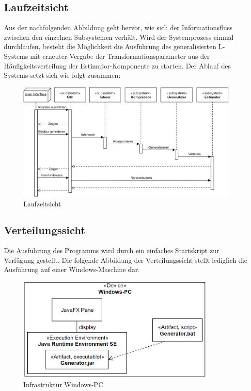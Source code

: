 \subsection*{Laufzeitsicht}
Aus der nachfolgenden Abbildung geht hervor, wie sich der Informationsfluss zwischen den einzelnen Subsystemen verhält.
Wird der Systemprozess einmal durchlaufen, besteht die Möglichkeit die Ausführung des generalisierten L-Systems mit
erneuter Vergabe der Transformationsparameter aus der Häufigkeitsverteilung der Estimator-Komponente zu starten.
Der Ablauf des Systems setzt sich wie folgt zusammen:

\begin{figure}[H]
    \centering
    \includegraphics[width=14cm]{../images/Laufzeitsicht.PNG}
    \caption{Laufzeitsicht}
\end{figure}

\newpage

\subsection*{Verteilungssicht}
Die Ausführung des Programms wird durch ein einfaches Startskript zur Verfügung gestellt.
Die folgende Abbildung der Verteilungssicht stellt lediglich die Ausführung auf einer Windows-Maschine dar.

\begin{figure}[H]
    \centering
    \includegraphics[width=10cm]{../images/Verteilungssicht.PNG}
    \caption{Infrastruktur Windows-PC}
\end{figure}

